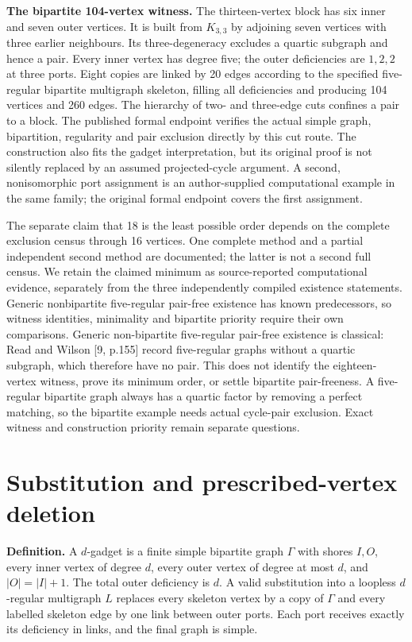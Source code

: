 \documentclass[smallextended]{svjour3}
\begin{document}
\textbf{The bipartite 104-vertex witness.} The thirteen-vertex block has
six inner and seven outer vertices. It is built from \(K_{3,3}\) by
adjoining seven vertices with three earlier neighbours. Its
three-degeneracy excludes a quartic subgraph and hence a pair. Every
inner vertex has degree five; the outer deficiencies are \(1,2,2\) at
three ports. Eight copies are linked by 20 edges according to the
specified five-regular bipartite multigraph skeleton, filling all
deficiencies and producing 104 vertices and 260 edges. The hierarchy of
two- and three-edge cuts confines a pair to a block. The published
formal endpoint verifies the actual simple graph, bipartition,
regularity and pair exclusion directly by this cut route. The
construction also fits the gadget interpretation, but its original proof
is not silently replaced by an assumed projected-cycle argument. A
second, nonisomorphic port assignment is an author-supplied
computational example in the same family; the original formal endpoint
covers the first assignment.

The separate claim that 18 is the least possible order depends on the
complete exclusion census through 16 vertices. One complete method and a
partial independent second method are documented; the latter is not a
second full census. We retain the claimed minimum as source-reported
computational evidence, separately from the three independently compiled
existence statements. Generic nonbipartite five-regular pair-free
existence has known predecessors, so witness identities, minimality and
bipartite priority require their own comparisons. Generic non-bipartite
five-regular pair-free existence is classical: Read and Wilson {[}9,
p.155{]} record five-regular graphs without a quartic subgraph, which
therefore have no pair. This does not identify the eighteen-vertex
witness, prove its minimum order, or settle bipartite pair-freeness. A
five-regular bipartite graph always has a quartic factor by removing a
perfect matching, so the bipartite example needs actual cycle-pair
exclusion. Exact witness and construction priority remain separate
questions.

\section{Substitution and prescribed-vertex
deletion}\label{substitution-and-prescribed-vertex-deletion}

\textbf{Definition.} A \(d\)-gadget is a finite simple bipartite graph
\(\Gamma\) with shores \(I,O\), every inner vertex of degree \(d\),
every outer vertex of degree at most \(d\), and \(|O|=|I|+1\). The total
outer deficiency is \(d\). A valid substitution into a loopless
\(d\)-regular multigraph \(L\) replaces every skeleton vertex by a copy
of \(\Gamma\) and every labelled skeleton edge by one link between outer
ports. Each port receives exactly its deficiency in links, and the final
graph is simple.
\end{document}
